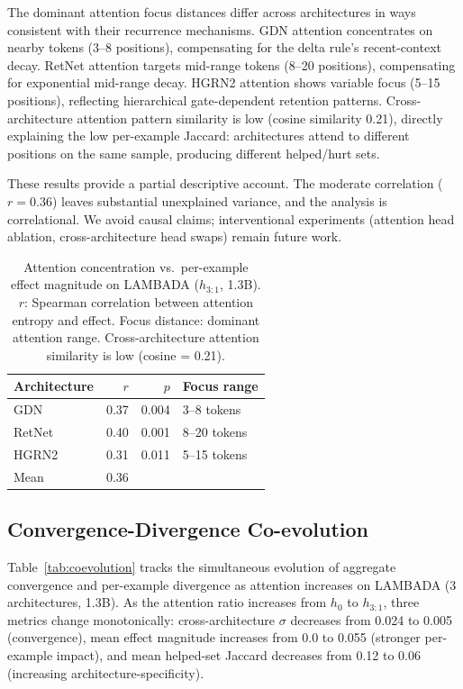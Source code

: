 \documentclass[11pt]{article}
\begin{document}
The dominant attention focus distances differ across architectures in ways consistent with their recurrence mechanisms.
GDN attention concentrates on nearby tokens (3--8 positions), compensating for the delta rule's recent-context decay.
RetNet attention targets mid-range tokens (8--20 positions), compensating for exponential mid-range decay.
HGRN2 attention shows variable focus (5--15 positions), reflecting hierarchical gate-dependent retention patterns.
Cross-architecture attention pattern similarity is low (cosine similarity 0.21), directly explaining the low per-example Jaccard: architectures attend to different positions on the same sample, producing different helped/hurt sets.

These results provide a partial descriptive account.
The moderate correlation ($r = 0.36$) leaves substantial unexplained variance, and the analysis is correlational.
We avoid causal claims; interventional experiments (attention head ablation, cross-architecture head swaps) remain future work.

\begin{table}[t]
\centering
\caption{Attention concentration vs.\ per-example effect magnitude on LAMBADA ($h_{3:1}$, 1.3B). $r$: Spearman correlation between attention entropy and effect. Focus distance: dominant attention range. Cross-architecture attention similarity is low (cosine = 0.21).}
\label{tab:attention}
\small
\begin{tabular}{lrrl}
\toprule
Architecture & $r$ & $p$ & Focus range \\
\midrule
GDN & 0.37 & 0.004 & 3--8 tokens \\
RetNet & 0.40 & 0.001 & 8--20 tokens \\
HGRN2 & 0.31 & 0.011 & 5--15 tokens \\
\midrule
Mean & 0.36 & & \\
\bottomrule
\end{tabular}
\end{table}

\subsection{Convergence-Divergence Co-evolution}

Table~\ref{tab:coevolution} tracks the simultaneous evolution of aggregate convergence and per-example divergence as attention increases on LAMBADA (3 architectures, 1.3B).
As the attention ratio increases from $h_0$ to $h_{3:1}$, three metrics change monotonically: cross-architecture $\sigma$ decreases from 0.024 to 0.005 (convergence), mean effect magnitude increases from 0.0 to 0.055 (stronger per-example impact), and mean helped-set Jaccard decreases from 0.12 to 0.06 (increasing architecture-specificity).
\end{document}

